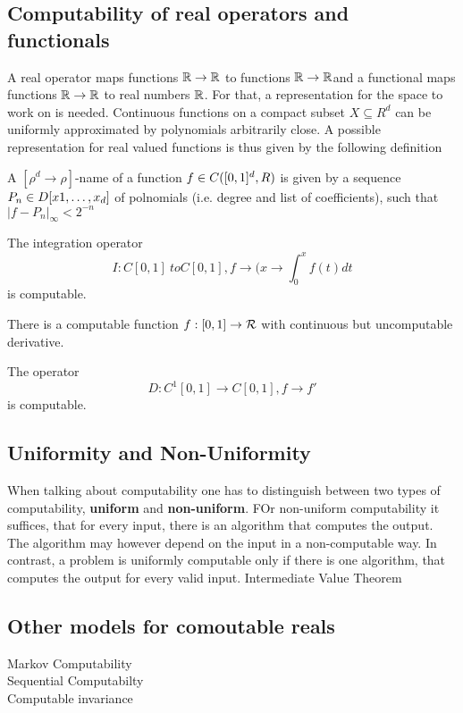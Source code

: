 \subsection{Computability of real operators and functionals}
A real operator maps functions $\mathbb R \to \mathbb R$ to functions $\mathbb R \to \mathbb R$and a functional maps functions $\mathbb R \to \mathbb R$ to real numbers $\mathbb R$.
For that, a representation for the space to work on is needed.
Continuous functions on a compact subset $X \subseteq R^d$ can be uniformly approximated by polynomials arbitrarily close.
A possible representation for real valued functions is thus given by the following definition 
\begin{definition}
A $[\rho^d \to \rho]$-name of a function $f \in C([0,1]^d, \\R)$ is given by a sequence $P_n \in \\D[x1, \dots, x_d]$ of polnomials (i.e. degree and list of coefficients), such that $\vert f - P_n \vert_\infty < 2^{-n}$   
\begin{theorem}[name?]
The integration operator 
$$I: C[0,1] \ to C[0,1], f \to (x \to \int_0^x f(t) dt$$   
is computable.
\end{theorem}
\begin{theorem}[Myhill 1971]
There is a computable function $f: [0,1] \to \mathcal R$ with continuous but uncomputable derivative. 
\end{theorem}
\begin{theorem}
The operator 
$$ D: C^1[0,1] \to C[0,1], f \to f'$$
is computable.
\end{theorem}
\end{definition}
\subsection{Uniformity and Non-Uniformity}
When talking about computability one has to distinguish between two types of computability, \textbf{uniform} and \textbf{non-uniform}.
FOr non-uniform computability it suffices, that for every input, there is an algorithm that computes the output. 
The algorithm may however depend on the input in a non-computable way.
In contrast, a problem is uniformly computable only if there is one algorithm, that computes the output for every valid input. 
Intermediate Value Theorem
\subsection{Other models for comoutable reals}
Markov Computability \\ 
Sequential Computabilty \\
Computable invariance \\
